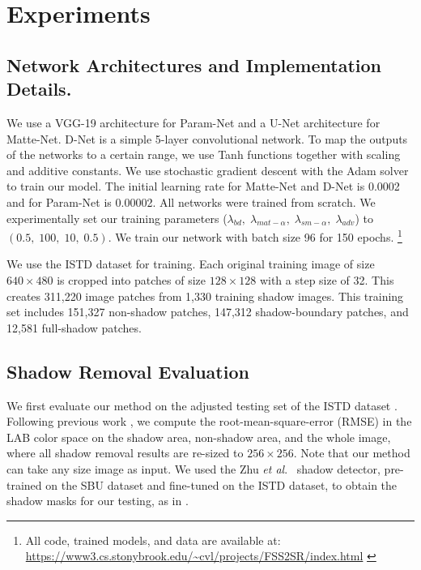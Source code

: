 \documentclass[runningheads]{llncs}
\newcommand{\pink}[1]{\textcolor{pink}{#1}}
\def\etal{\emph{et al}.}
\begin{document}
\section{Experiments}
\subsection{Network Architectures and Implementation Details.}
We use a VGG-19 architecture for Param-Net and a U-Net architecture for Matte-Net. D-Net is a simple 5-layer convolutional network. To map the outputs of the networks to a certain range, we use Tanh functions together with scaling and additive constants. We use stochastic gradient descent
with the Adam solver \cite{Adam} to train our model. The initial learning rate for Matte-Net and D-Net is 0.0002 and for Param-Net is 0.00002. All networks were trained from scratch. We experimentally set our training parameters ($\lambda_{bd},\; \lambda_{mat-\alpha},\; \lambda_{sm-\alpha},\; \lambda_{adv}$) to $(0.5,\; 100,\; 10,\; 0.5)$. We train our network with batch size 96 for 150 epochs. \footnote{All  code, trained models, and data are available at: \pink{\url{ https://www3.cs.stonybrook.edu/~cvl/projects/FSS2SR/index.html} }}

We use the ISTD dataset \cite{Wang_2018_CVPR} for training. Each original training image of size $640\times480$ is cropped into patches of size $128\times128$ with a step size of 32. This creates 311,220 image patches from 1,330 training shadow images. This training set includes 151,327 non-shadow patches, 147,312 shadow-boundary patches, and 12,581 full-shadow patches. 

\subsection{Shadow Removal Evaluation}



We first evaluate our method on the adjusted testing set of the ISTD dataset \cite{Wang_2018_CVPR,Le-etal-ICCV19}. Following previous work \cite{Wang_2018_CVPR,guoPami,Qu_2017_CVPR,Le-etal-ICCV19}, we compute the root-mean-square-error (RMSE) in the LAB color space on the shadow area, non-shadow area, and the whole image, where all shadow removal results are re-sized to $256\times256$. Note that our method can  take any size image as input. We used the Zhu \etal~\cite{zhu18b} shadow detector, pre-trained on the SBU dataset and fine-tuned on the ISTD dataset, to obtain the shadow masks for our testing, as in \cite{Le-etal-ICCV19}. 
\end{document}
